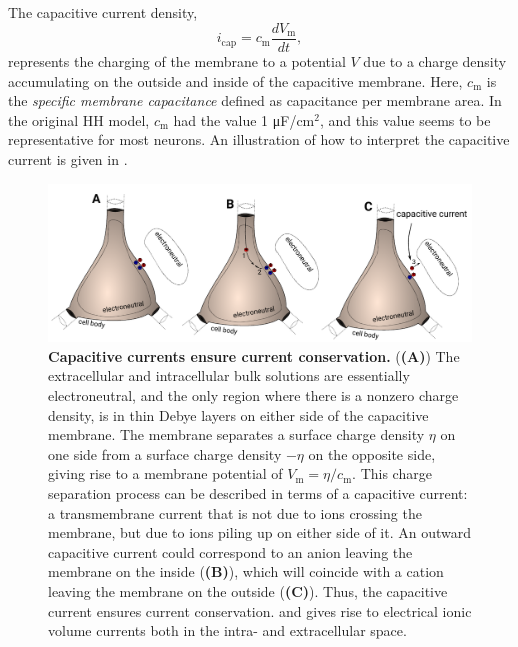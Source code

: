 \subsection{}
\label{sec:Neuron:Cap}
The capacitive current density,
\begin{equation}
i_{\mathrm{cap}}= c_{\mathrm{m}} \frac{dV_\mathrm{m}}{dt},
\label{eq:Neuron:HHcap}
\end{equation}
represents the charging  of the membrane to a potential $V$ due to a charge density accumulating on the outside and inside of the capacitive membrane. Here, $c_{\mathrm{m}}$ is the \textit{specific membrane capacitance} defined as capacitance per membrane area. In the original HH model, $c_{\mathrm{m}}$ had the value 1 \si{\micro \farad / \cm}$^2$, and this value seems to be representative for most neurons.  An illustration of how to interpret the capacitive current is given in . 

\begin{figure}[!ht]
\begin{center}
\includegraphics[width=1.0\textwidth]{Figures/Neuron/capacitive_currents.pdf}
\end{center}
\caption{\textbf{Capacitive currents ensure current conservation.} (\textbf{(A)}) The extracellular and intracellular bulk solutions are essentially electroneutral, and the only region where there is a nonzero charge density, is in thin Debye layers on either side of the capacitive membrane. The membrane separates a surface charge density $\eta$ on one side from a surface charge density $-\eta$ on the opposite side, giving rise to a membrane potential of $V_\mathrm{m} = \eta/c_{\mathrm{m}}$. This charge separation process can be described in terms of a capacitive current: a transmembrane current that is not due to ions crossing the membrane, but due to ions piling up on either side of it.  An outward capacitive current could correspond to an anion leaving the membrane on the inside (\textbf{(B)}), which will coincide with a cation leaving the membrane on the outside (\textbf{(C)}). Thus, the capacitive current ensures current conservation. and gives rise to electrical ionic volume currents both in the intra- and extracellular space.
}
\label{fig:Neuron:capacitive_currents}
\end{figure}

